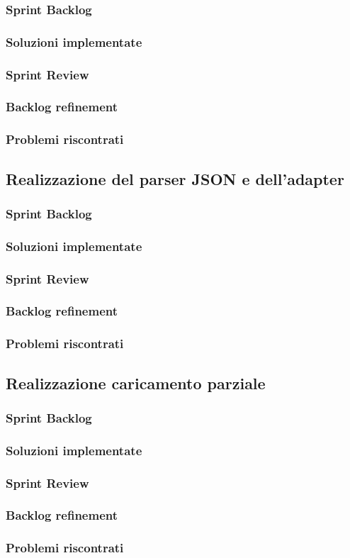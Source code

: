 \subsubsection{Sprint Backlog}
\subsubsection{Soluzioni implementate}
\subsubsection{Sprint Review}
\subsubsection{Backlog refinement}
\subsubsection{Problemi riscontrati}

\subsection{Realizzazione del parser JSON e dell'adapter}
\subsubsection{Sprint Backlog}
\subsubsection{Soluzioni implementate}
\subsubsection{Sprint Review}
\subsubsection{Backlog refinement}
\subsubsection{Problemi riscontrati}

\subsection{Realizzazione caricamento parziale}
\subsubsection{Sprint Backlog}
\subsubsection{Soluzioni implementate}
\subsubsection{Sprint Review}
\subsubsection{Backlog refinement}
\subsubsection{Problemi riscontrati}


